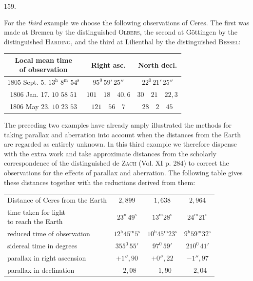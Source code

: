 \par{}\medskip
\hypertarget{native-218-article159}{}
\begin{center}159.\end{center}
For the \emph{third} example we choose the following observations of Ceres. The
first was made at Bremen by the distinguished \textsc{Olbers}, the second at Göttingen by the distinguished \textsc{Harding}, and the third at Lilienthal by the distinguished \textsc{Bessel}:
\begin{center}\begingroup\footnotesize\setlength{\tabcolsep}{3pt}\renewcommand{\arraystretch}{1.3}
\begin{tabular}{|c|c|c|}
\hline
\shortstack{Local mean time\\of observation} & Right asc. & North decl. \\
\hline
1805 Sept. 5. $13^{\mathrm h}$ $8^{\mathrm m}$ $54^{\mathrm s}$ & $95^0\,59'\,25''$ & $22^0\,21'\,25''$ \\
1806 Jan. 17. $10$ $58$ $51$ & $101\quad18\quad40{,}6$ & $30\quad21\quad22{,}3$ \\
1806 May 23. $10$ $23$ $53$ & $121\quad56\quad7$ & $28\quad2\quad45$ \\
\hline
\end{tabular}
\endgroup\end{center}

The preceding two examples have already amply illustrated the methods for taking
parallax and aberration into account when the distances from the Earth are regarded
as entirely unknown. In this third example we therefore dispense with the extra
work and take approximate distances from the scholarly correspondence of the
distinguished de \textsc{Zach} (Vol. XI p. 284) to correct the observations for the effects of parallax and aberration. The following table gives these distances
together with the reductions derived from them:
\begin{center}\begingroup\footnotesize\setlength{\tabcolsep}{3pt}\renewcommand{\arraystretch}{1.3}
\begin{tabular}{l|c|c|c}
Distance of Ceres from the Earth & $2{,}899$ & $1{,}638$ & $2{,}964$ \\
\shortstack[l]{time taken for light\\to reach the Earth} & $23^{\mathrm m}49^{\mathrm s}$ & $13^{\mathrm m}28^{\mathrm s}$ & $24^{\mathrm m}21^{\mathrm s}$ \\
reduced time of observation & $12^{\mathrm h}45^{\mathrm m}5^{\mathrm s}$ & $10^{\mathrm h}45^{\mathrm m}23^{\mathrm s}$ & $9^{\mathrm h}59^{\mathrm m}32^{\mathrm s}$ \\
sidereal time in degrees & $355^0\,55'$ & $97^0\,59'$ & $210^0\,41'$ \\
parallax in right ascension & $+1''{,}90$ & $+0''{,}22$ & $-1''{,}97$ \\
parallax in declination & $-2{,}08$ & $-1{,}90$ & $-2{,}04$ \\
\end{tabular}
\endgroup\end{center}

